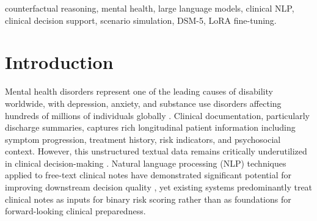 \documentclass[conference]{IEEEtran}
\begin{document}
\begin{abstract}
Clinical notes on patients with mental health conditions contain rich, unstructured information that remains critically underutilized in clinical decision-making. Existing AI systems for mental health prioritize risk score prediction, leaving clinicians and psychology students unprepared for extreme adverse patient trajectories. We propose and implement a fine-tuned large language model (LLM) framework that acts as a second reader of mental health documentation---not to predict outcomes, but to prepare clinicians for extreme patient trajectories. The framework operates in three stages: (1) Clinical Factor Extraction, using a LoRA-adapted Microsoft Phi-3.5-Mini-Instruct model to extract structured risk and protective factors from unstructured clinical notes following a DSM-5 and ICD-11 grounded schema; (2) Extreme Scenario Generation, employing Tree-of-Thoughts prompting to generate counterfactual narratives across three distinct escalation pathways (psychiatric deterioration, substance use escalation, and social-environmental collapse); and (3) Clinical Report Generation, synthesizing extracted factors and scenarios into actionable preparedness briefings. The system is trained on 94,592 de-identified discharge summaries from the MIMIC-IV clinical database over 5 epochs, achieving a final evaluation loss of 1.706 and 67.5\% mean token accuracy on structured extraction. We present the complete system architecture, training methodology, and qualitative analysis of generated outputs. To the best of our knowledge, this is the first implemented framework employing counterfactual simulation of extreme mental health scenarios for clinical preparedness.
\end{abstract}

\begin{IEEEkeywords}
counterfactual reasoning, mental health, large language models, clinical NLP, clinical decision support, scenario simulation, DSM-5, LoRA fine-tuning.
\end{IEEEkeywords}

\section{Introduction}

Mental health disorders represent one of the leading causes of disability worldwide, with depression, anxiety, and substance use disorders affecting hundreds of millions of individuals globally \cite{b1}. Clinical documentation, particularly discharge summaries, captures rich longitudinal patient information including symptom progression, treatment history, risk indicators, and psychosocial context. However, this unstructured textual data remains critically underutilized in clinical decision-making \cite{b2}. Natural language processing (NLP) techniques applied to free-text clinical notes have demonstrated significant potential for improving downstream decision quality \cite{b3}, yet existing systems predominantly treat clinical notes as inputs for binary risk scoring rather than as foundations for forward-looking clinical preparedness.
\end{document}
